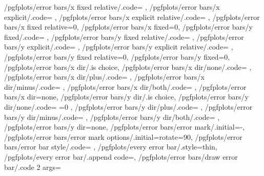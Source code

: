 {	/pgfplots/error bars/x fixed relative/.code=		\def\pgfplots@errorbars@xrel{#1}\def\pgfplots@errorbars@xmode{1},
	/pgfplots/error bars/x explicit/.code=			\def\pgfplots@errorbars@xmode{2},
	/pgfplots/error bars/x explicit relative/.code=	\def\pgfplots@errorbars@xmode{3},
	/pgfplots/error bars/x fixed relative=0,
	/pgfplots/error bars/x fixed=0,
	/pgfplots/error bars/y fixed/.code=				\def\pgfplots@errorbars@yfixed{#1}\def\pgfplots@errorbars@ymode{0},
	/pgfplots/error bars/y fixed relative/.code=		\def\pgfplots@errorbars@yrel{#1}\def\pgfplots@errorbars@ymode{1},
	/pgfplots/error bars/y explicit/.code=			\def\pgfplots@errorbars@ymode{2},
	/pgfplots/error bars/y explicit relative/.code=	\def\pgfplots@errorbars@ymode{3},
	/pgfplots/error bars/y fixed relative=0,
	/pgfplots/error bars/y fixed=0,
	/pgfplots/error bars/x dir/.is choice,
	/pgfplots/error bars/x dir/none/.code={%
		\def\pgfplots@errorbars@xdirection{0}%
		\ifnum{}
			\pgfplots@errorbars@enabledfalse
		\fi
	},
	/pgfplots/error bars/x dir/plus/.code=				\def\pgfplots@errorbars@xdirection{1}\pgfplots@errorbars@enabledtrue,
	/pgfplots/error bars/x dir/minus/.code=				\def\pgfplots@errorbars@xdirection{2}\pgfplots@errorbars@enabledtrue,
	/pgfplots/error bars/x dir/both/.code=				\def\pgfplots@errorbars@xdirection{3}\pgfplots@errorbars@enabledtrue,
	/pgfplots/error bars/x dir=none,
	/pgfplots/error bars/y dir/.is choice,
	/pgfplots/error bars/y dir/none/.code={%
		\def\pgfplots@errorbars@ydirection{0}%
		\ifnum\pgfplots@errorbars@xdirection=0
			\pgfplots@errorbars@enabledfalse
		\fi
	},
	/pgfplots/error bars/y dir/plus/.code=				\def\pgfplots@errorbars@ydirection{1}\pgfplots@errorbars@enabledtrue,
	/pgfplots/error bars/y dir/minus/.code=				\def\pgfplots@errorbars@ydirection{2}\pgfplots@errorbars@enabledtrue,
	/pgfplots/error bars/y dir/both/.code=				\def\pgfplots@errorbars@ydirection{3}\pgfplots@errorbars@enabledtrue,
	/pgfplots/error bars/y dir=none,
	/pgfplots/error bars/error mark/.initial={-},
	/pgfplots/error bars/error mark options/.initial={rotate=90},
	/pgfplots/error bars/error bar style/.code={%
	},
	/pgfplots/every error bar/.style={thin},
	/pgfplots/every error bar/.append code={},
	/pgfplots/error bars/draw error bar/.code 2 args={%
}}
